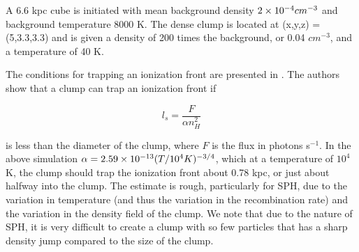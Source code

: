 A 6.6 kpc cube is initiated with mean background density $2\times 10^{-4} cm^{-3}$ and background temperature 8000 K. The dense clump is located at (x,y,z) = (5,3.3,3.3) and is given a density of 200 times the background, or 0.04 $cm^{-3}$, and a temperature of 40 K.

The conditions for trapping an ionization front are presented in \citet{shapiroEt04}. The authors show that a clump can trap an ionization front if

\begin{equation}
\label{eq:ifronttrap}
l_s = \frac{F}{\alpha n_H^2}
\end{equation}

\noindent
is less than the diameter of the clump, where $F$ is the flux in photons s$^{-1}$. In the above simulation $\alpha = 2.59\times 10^{-13} (T/10^4 K)^{-3/4}$, which at a temperature of $10^4$ K, the clump should trap the ionization front about 0.78 kpc, or just about halfway into the clump. The estimate is rough, particularly for SPH, due to the variation in temperature (and thus the variation in the recombination rate) and the variation in the density field of the clump. We note that due to the nature of SPH, it is very difficult to create a clump with so few particles that has a sharp density jump compared to the size of the clump.

